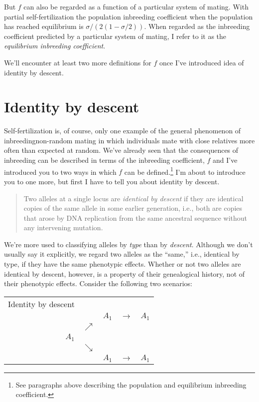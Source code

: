 But $f$ can also be regarded as a function of a particular system of
mating. With partial self-fertilization the population inbreeding
coefficient when the population has reached equilibrium is
$\sigma/(2(1-\sigma/2))$. When regarded as the inbreeding coefficient
predicted by a particular system of mating, I refer to it as the {\it
  equilibrium inbreeding coefficient}.

We'll encounter at least two more definitions for $f$ once I've
introduced idea of identity by descent.

\section*{Identity by descent}

Self-fertilization is, of course, only one example of the general
phenomenon of inbreeding{\dash}non-random mating in which individuals
mate with close relatives more often than expected at random. We've
already seen that the consequences of inbreeding can be described in
terms of the inbreeding coefficient, $f$ and I've introduced you to
two ways in which $f$ can be defined.\footnote{See paragraphs above
describing the population and equilibrium inbreeding coefficient.} I'm
about to introduce you to one more, but first I have to tell you about
identity by descent.

\begin{quote}
  Two alleles at a single locus are {\it identical by descent\/} if
  they are identical copies of the same allele in some earlier
  generation, i.e., both are copies that arose by DNA replication from
  the same ancestral sequence without any intervening
  mutation.
\end{quote}

We're more used to classifying alleles by {\it type\/} than by {\it
  descent}. Although we don't usually say it explicitly, we regard
two alleles as the ``same,'' i.e., identical by type,  if they have the same phenotypic effects. Whether or not
two alleles are identical by descent, however, is a property of their
genealogical history, not of their phenotypic effects. Consider the
following two scenarios:

\begin{center}
\begin{tabular}{rcccc}
Identity by descent \\
      &            & $A_1$ & $\rightarrow$ & $A_1$ \\
      & $\nearrow$ &       &               & \\
$A_1$ &            &       &               & \\
      & $\searrow$ &       &               & \\
      &            & $A_1$ & $\rightarrow$ & $A_1$ 
\end{tabular}
\end{center}

